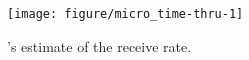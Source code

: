\begin{figure}
    \centering
\begin{knitrout}
\color{fgcolor}
\texttt{[image: figure/micro\_time-thru-1]} 

\end{knitrout}

    \caption{\name's estimate of the receive rate.}
    \label{fig:micro:time-thru}
\end{figure}
